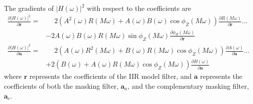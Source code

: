 \documentclass[a4paper,twoside,10pt,english]{report}
\begin{document}
The gradients of $\left|H\left(\omega\right)\right|^{2}$ with respect to the 
coefficients are
\begin{align*}
\frac{\partial\left|H\left(\omega\right)\right|^{2}}{\partial\boldsymbol{r}}=
&\phantom{-}2\left(A^{2}\left(\omega\right)R\left(M\omega\right)
+A\left(\omega\right)B\left(\omega\right)\cos\phi_{Z}\left(M\omega\right)\right)
\frac{\partial R\left(M\omega\right)}{\partial\boldsymbol{r}} \hdots \\
&-2A\left(\omega\right)B\left(\omega\right)R\left(M\omega\right)
\sin\phi_{Z}\left(M\omega\right)
\frac{\partial \phi_{R}\left(M\omega\right)}{\partial\boldsymbol{r}} \\
\frac{\partial\left|H\left(\omega\right)\right|^{2}}{\partial\boldsymbol{a}}=
&\phantom{+}2\left(A\left(\omega\right)R^{2}\left(M\omega\right)+
B\left(\omega\right)R\left(M\omega\right)\cos\phi_{Z}\left(M\omega\right)\right)
\frac{\partial A\left(\omega\right)}{\partial\boldsymbol{a}} \hdots \\
&+2\left(B\left(\omega\right)+
A\left(\omega\right)R\left(M\omega\right)\cos\phi_{Z}\left(M\omega\right)\right)
\frac{\partial B\left(\omega\right)}{\partial\boldsymbol{a}}
\end{align*}
where $\boldsymbol{r}$ represents the coefficients of the IIR model filter,
and $\boldsymbol{a}$ represents the coefficients of both the masking filter, 
$\boldsymbol{a}_{a}$, and the complementary masking filter, $\boldsymbol{a}_{c}$.
\end{document}
